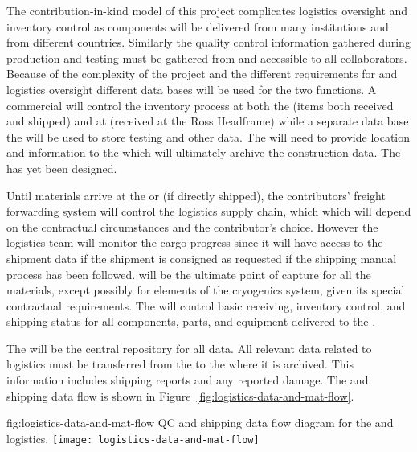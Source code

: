 The contribution-in-kind model of this project complicates logistics oversight and inventory control as components will be delivered from many institutions and from different countries. 
Similarly the quality control information gathered during production and testing must be gathered from and accessible to all collaborators. 
Because of the complexity of the project and the different requirements for  and logistics oversight different data bases will be used for the two functions. A commercial  will control the inventory process at both the  (items both received and shipped) and at  (received at the Ross Headframe) while a separate data base the  will be used to store testing and other  data. The  will need to provide location and   information to the  which will ultimately archive the construction data. The  has yet been designed.

Until materials arrive at the  or  (if directly shipped), the contributors' freight forwarding system will control the logistics supply chain, which which will depend on the contractual circumstances and the contributor's choice. However the  logistics team will monitor the cargo progress since it will have access to the shipment data if the shipment is consigned as requested if the shipping manual process has been followed.    will be the ultimate point of capture for all the materials, except possibly for elements of the cryogenics system, given its special contractual requirements. The  will control basic receiving, inventory control, and shipping status for all components, parts, and equipment delivered to the .

The  will be the central repository for all  data. All relevant  data related to logistics must be transferred from the  to the  where it is archived. This information includes shipping reports and any reported damage. 
The  and shipping data flow is shown in Figure~\ref{fig:logistics-data-and-mat-flow}.

 

\begin{dunefigure}{fig:logistics-data-and-mat-flow}
  {QC and shipping data flow diagram for the  and  logistics.}
 \texttt{[image: logistics-data-and-mat-flow]}
\end{dunefigure}

